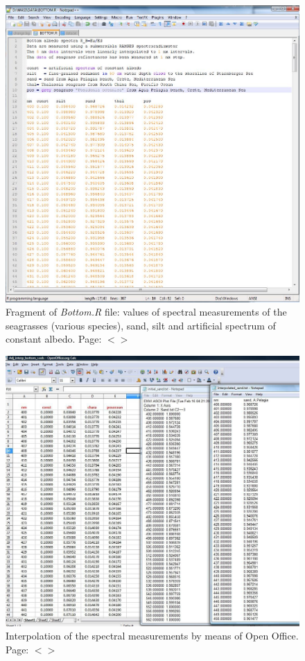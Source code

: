 \documentclass[11pt]{article}
\begin{document}
\begin{appendices}
\begin{figure}[H]
	\centering
	\includegraphics[scale=0.4]{Fig-28.jpg}
	\caption{Fragment of \textit{Bottom.R} file: values of spectral measurements of the
		seagrasses (various species), sand, silt and artificial spectrum of constant albedo. Page: $<$\pageref{page-28}$>$}
	\label{fig:A.9}
\end{figure}
\pagebreak

\begin{figure}[H]
	\begin{center}
		\includegraphics[scale=0.35]{Interpolation.jpg}
		\caption{Interpolation of the spectral measurements by means of Open Office. Page: $<$\pageref{page-28}$>$}
		\label{fig:A.10}
	\end{center}
\end{figure}
\pagebreak


\end{appendices}
\end{document}
